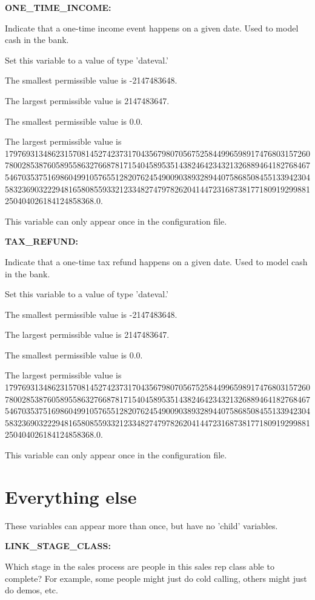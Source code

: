 \textbf{ONE\_TIME\_INCOME:}


Indicate that a one-time income event happens on a given date.  Used to model cash in the bank.

Set this variable to a value of type 'dateval.'

The smallest permissible value is -2147483648.

The largest permissible value is 2147483647.

The smallest permissible value is 0.0.

The largest permissible value is 179769313486231570814527423731704356798070567525844996598917476803157260780028538760589558632766878171540458953514382464234321326889464182768467546703537516986049910576551282076245490090389328944075868508455133942304583236903222948165808559332123348274797826204144723168738177180919299881250404026184124858368.0.

This variable can only appear once in the configuration file.


\textbf{TAX\_REFUND:}


Indicate that a one-time tax refund happens on a given date.  Used to model cash in the bank.

Set this variable to a value of type 'dateval.'

The smallest permissible value is -2147483648.

The largest permissible value is 2147483647.

The smallest permissible value is 0.0.

The largest permissible value is 179769313486231570814527423731704356798070567525844996598917476803157260780028538760589558632766878171540458953514382464234321326889464182768467546703537516986049910576551282076245490090389328944075868508455133942304583236903222948165808559332123348274797826204144723168738177180919299881250404026184124858368.0.

This variable can only appear once in the configuration file.


\section{Everything else}


These variables can appear more than once, but have no 'child' variables.


\textbf{LINK\_STAGE\_CLASS:}


Which stage in the sales process are people in this sales rep class able to complete?  For example, some people might just do cold calling, others might just do demos, etc.

